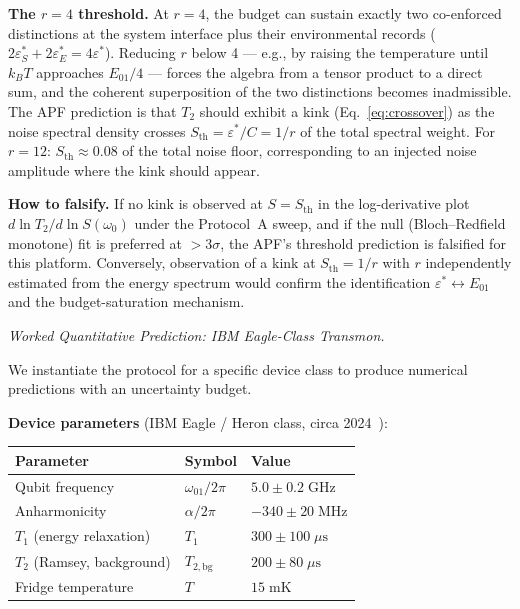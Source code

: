 \documentclass[11pt]{article}
\theoremstyle{remark}
\begin{document}
\medskip\noindent\textbf{The $r = 4$ threshold.}  At $r = 4$, the budget can sustain exactly two co-enforced distinctions at the system interface plus their environmental records ($2\varepsilon^*_S + 2\varepsilon^*_E = 4\varepsilon^*$).  Reducing $r$ below 4 --- e.g., by raising the temperature until $k_BT$ approaches $E_{01}/4$ --- forces the algebra from a tensor product to a direct sum, and the coherent superposition of the two distinctions becomes inadmissible.  The APF prediction is that $T_2$ should exhibit a kink (Eq.~\eqref{eq:crossover}) as the noise spectral density crosses $S_{\mathrm{th}} = \varepsilon^*/C = 1/r$ of the total spectral weight.  For $r = 12$: $S_{\mathrm{th}} \approx 0.08$ of the total noise floor, corresponding to an injected noise amplitude where the kink should appear.

\medskip\noindent\textbf{How to falsify.}  If no kink is observed at $S = S_{\mathrm{th}}$ in the log-derivative plot $d\ln T_2 / d\ln S(\omega_0)$ under the Protocol~A sweep, and if the null (Bloch--Redfield monotone) fit is preferred at $> 3\sigma$, the APF's threshold prediction is falsified for this platform.  Conversely, observation of a kink at $S_{\mathrm{th}} = 1/r$ with $r$ independently estimated from the energy spectrum would confirm the identification $\varepsilon^* \leftrightarrow E_{01}$ and the budget-saturation mechanism.


\medskip\noindent\textit{Worked Quantitative Prediction: IBM Eagle-Class Transmon.}

We instantiate the protocol for a specific device class to produce numerical predictions with an uncertainty budget.

\smallskip\noindent\textbf{Device parameters} (IBM Eagle / Heron class, circa 2024~\cite{IBMEagle2022}):
\begin{center}
\small
\begin{tabular}{@{}lll@{}}
Parameter & Symbol & Value \\[2pt]
\hline\noalign{\smallskip}
Qubit frequency & $\omega_{01}/2\pi$ & $5.0 \pm 0.2\;\mathrm{GHz}$ \\
Anharmonicity & $\alpha/2\pi$ & $-340 \pm 20\;\mathrm{MHz}$ \\
$T_1$ (energy relaxation) & $T_1$ & $300 \pm 100\;\mu\mathrm{s}$ \\
$T_2$ (Ramsey, background) & $T_{2,\mathrm{bg}}$ & $200 \pm 80\;\mu\mathrm{s}$ \\
Fridge temperature & $T$ & $15\;\mathrm{mK}$ \\
\end{tabular}
\end{center}
\end{document}
